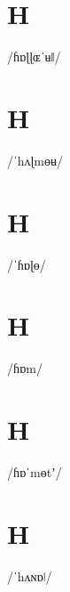 \documentclass[10pt,a4paper,twoside]{book}
\begin{document}
\section*{H}

\begin{multicols}{3}
 {/ɦɒɭɭɶˈʉǁ/} {}
\end{multicols}

\section*{H}

\begin{multicols}{3}
 {/ˈhʌɭmɵʉ/} {}
\end{multicols}

\section*{H}

\begin{multicols}{3}
 {/ˈɦɒɭɵ/} {}
\end{multicols}

\section*{H}

\begin{multicols}{3}
 {/ɦɒm/} {}
\end{multicols}

\section*{H}

\begin{multicols}{3}
 {/ɦɒˈmɵtʼ/} {}
\end{multicols}

\section*{H}

\begin{multicols}{3}
 {/ˈhʌɴɒǀ/} {}
\end{multicols}
\end{document}
